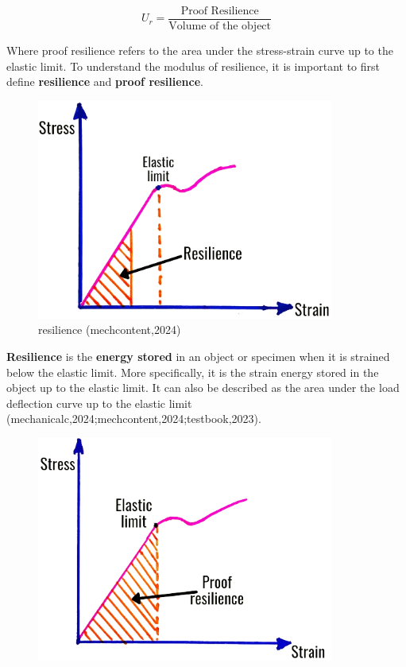 \documentclass{article}
\begin{document}
{\begin{equation}
    U_r = \frac{\text{Proof Resilience}}{\text{Volume of the object}}
\end{equation}

Where proof resilience refers to the area under the stress-strain curve up to the elastic limit. To understand the modulus of resilience, it is important to first define \textbf{resilience} and \textbf{proof resilience}.

\begin{center}
\begin{minipage}[t]{0.46\textwidth}
\begin{figure}[H]
    \centering
    \includegraphics[width=0.87\textwidth]{images/resilience-1.png}
    \caption{resilience (mechcontent,2024)}
    \label{fig:resilience}
\end{figure}
\textbf{Resilience} is the \textbf{energy stored} in an object or specimen when it is strained below the elastic limit. More specifically, it is the strain energy stored in the object up to the elastic limit. It can also be described as the area under the load deflection curve up to the elastic limit (mechanicalc,2024;mechcontent,2024;testbook,2023).
\end{minipage}\hfil
\begin{minipage}[t]{0.46\textwidth}
\begin{figure}[H]
    \centering
    \includegraphics[width=0.87\textwidth]{images/proof-resilience-1.png}

\end{figure}
\end{minipage}
\end{center}}
\end{document}
